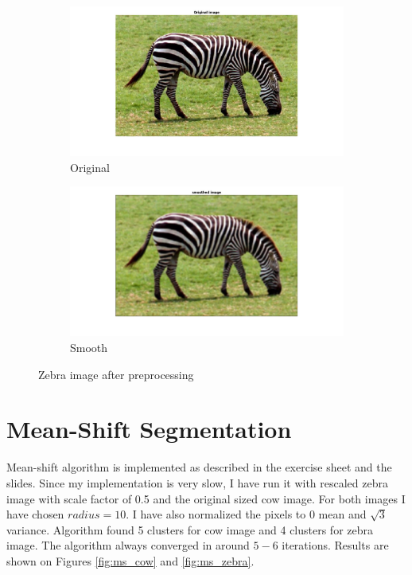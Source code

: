 \documentclass[paper=a4, fontsize=11pt]{scrartcl} %
\numberwithin{equation}{section} %
\numberwithin{figure}{section} %
\numberwithin{table}{section} %
\begin{document}
\begin{figure}
\centering
\begin{subfigure}{.5\textwidth}
  \centering
  \includegraphics[width=\linewidth]{zebra/orig.jpg}
  \caption{Original}
\end{subfigure}%
\begin{subfigure}{.5\textwidth}
  \centering
  \includegraphics[width=\linewidth]{zebra/smooth.jpg}
  \caption{Smooth}
\end{subfigure}
\caption{Zebra image after preprocessing}
\label{fig:zebra}
\end{figure}


\section{Mean-Shift Segmentation}

Mean-shift algorithm is implemented as described in the exercise sheet and the slides. Since my implementation is very slow, I have run it with rescaled zebra image with scale factor of 0.5 and the original sized cow image. For both images I have chosen $radius=10$. I have also normalized the pixels to 0 mean and $\sqrt{3}$ variance. Algorithm found 5 clusters for cow image and 4 clusters for zebra image. The algorithm always converged in around $5-6$ iterations. Results are shown on Figures \ref{fig:ms_cow} and \ref{fig:ms_zebra}.
\end{document}
